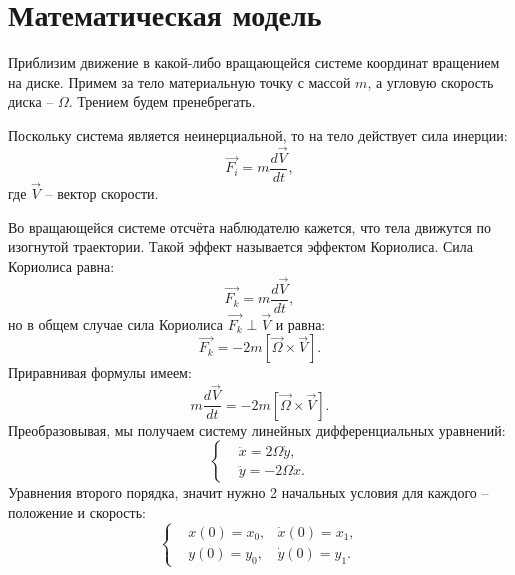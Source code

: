 \section{Математическая модель}
    Приблизим движение в какой-либо вращающейся системе координат вращением на диске. Примем за тело материальную точку с массой \( m \), а угловую скорость диска -- \( \Omega \). Трением будем пренебрегать.

    Поскольку система является неинерциальной, то на тело действует сила инерции:
    \[
        \overrightarrow{F_i} = m \frac{d \overrightarrow{V}}{dt},
    \]
    где \( \overrightarrow{V} \) -- вектор скорости.

    Во вращающейся системе отсчёта наблюдателю кажется, что тела движутся по изогнутой траектории. Такой эффект называется эффектом Кориолиса. Сила Кориолиса равна:
    \[
        \overrightarrow{F_k} = m \frac{d \overrightarrow{V}}{dt},
    \]
    но в общем случае сила Кориолиса \( \overrightarrow{F_k} \perp \overrightarrow{V} \) и равна:
    \[
        \overrightarrow{F_k} = - 2 m \left[ \overrightarrow{\Omega} \times \overrightarrow{V} \right].
    \]
    Приравнивая формулы имеем:
    \[
        m \frac{d \overrightarrow{V}}{dt} = - 2 m \left[ \overrightarrow{\Omega} \times \overrightarrow{V} \right].
    \]
    Преобразовывая, мы получаем систему линейных дифференциальных уравнений:
    \[
        \left\{ \begin{split}
            & \ddot{x} = 2 \Omega \dot{y}, \\
            & \ddot{y} = -2\Omega \dot{x}.
        \end{split} \right.
    \]
    Уравнения второго порядка, значит нужно 2 начальных условия для каждого -- положение и скорость:
    \[
        \left\{\begin{split}
            & x(0) = x_0, & \dot{x}(0) = x_1, \\
            & y(0) = y_0, & \dot{y}(0) = y_1.
        \end{split}\right.
    \]
